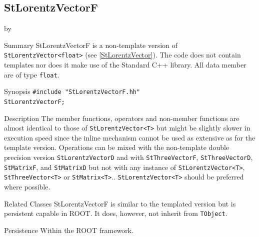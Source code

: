 \documentclass[twoside]{article}
\newcommand{\entrylabel}[1]{\mbox{\textbf{{#1}}}\hfil}%
\newenvironment{entry}
{\begin{list}{}%
    {\renewcommand{\makelabel}{\entrylabel}%
     \setlength{\labelwidth}{90pt}%
     \setlength{\leftmargin}{\labelwidth}
     \advance\leftmargin by \labelsep%
      }%
    }%
  {\end{list}}
\newcommand{\Entrylabel}[1]%
{\raisebox{0pt}[1ex][0pt]{\makebox[\labelwidth][l]%
    {\parbox[t]{\labelwidth}{\hspace{0pt}\textbf{{#1}}}}}}
\newenvironment{Entry}%
{\renewcommand{\entrylabel}{\Entrylabel}\begin{entry}}%
  {\end{entry}}
\begin{document}
\subsection{StLorentzVectorF } \label{StLorentzVectorF}
\begin{Entry}
\item[Summary]
    StLorentzVectorF is a non-template version of \verb+StLorentzVector<float>+
    (see \ref{StLorentzVector}). The code does not contain templates nor
    does it make use of the Standard C++ library. All data member are of
    type \texttt{float}.
    
\item[Synopsis]
    \verb+#include "StLorentzVectorF.hh"+ \\
    \verb+StLorentzVectorF;+
    
    
\item[Description]       
    The member functions, operators and non-member functions are almost identical
    to those of \verb+StLorentzVector<T>+ but might be slightly slower in execution speed
    since the inline mechanism cannot be used as extensive as for the template
    version. Operations can be mixed with the non-template double precision version
    \texttt{StLorentzVectorD} and with \texttt{StThreeVectorF}, \texttt{StThreeVectorD},
    \texttt{StMatrixF}, and \texttt{StMatrixD}
    but not with any instance of \verb+StLorentzVector<T>+, \verb+StThreeVector<T>+ or
    \verb+StMatrix<T>+..
    \verb+StLorentzVector<T>+ should be preferred where possible.

\item[Related Classes]
    StLorentzVectorF is similar to the templated version but
    is persistent capable in ROOT. It does, however, not inherit
    from \texttt{TObject}.
    
\item[Persistence]
    Within the ROOT framework.

\end{Entry}

\clearpage

%
%
\end{document}
